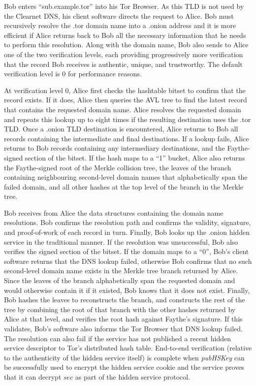 Bob enters ``sub.example.tor'' into his Tor Browser. As this TLD is not used by the Clearnet DNS, his client software directs the request to Alice. Bob must recursively resolve the .tor domain name into a .onion address and it is more efficient if Alice returns back to Bob all the necessary information that he needs to perform this resolution. Along with the domain name, Bob also sends to Alice one of the two verification levels, each providing progressively more verification that the record Bob receives is authentic, unique, and trustworthy. The default verification level is 0 for performance reasons.

At verification level 0, Alice first checks the hashtable bitset to confirm that the record exists. If it does, Alice then queries the AVL tree to find the latest record that contains the requested domain name. Alice resolves the requested domain and repeats this lookup up to eight times if the resulting destination uses the .tor TLD. Once a .onion TLD destination is encountered, Alice returns to Bob all records containing the intermediate and final destinations. If a lookup fails, Alice returns to Bob records containing any intermediary destinations, and the Faythe-signed section of the bitset. If the hash maps to a ``1'' bucket, Alice also returns the Faythe-signed root of the Merkle collision tree, the leaves of the branch containing neighbouring second-level domain names that alphabetically span the failed domain, and all other hashes at the top level of the branch in the Merkle tree.

Bob receives from Alice the data structures containing the domain name resolutions. Bob confirms the resolution path and confirms the validity, signature, and proof-of-work of each record in turn. Finally, Bob looks up the .onion hidden service in the traditional manner. If the resolution was unsuccessful, Bob also verifies the signed section of the bitset. If the domain maps to a ``0'', Bob's client software returns that the DNS lookup failed, otherwise Bob confirms that no such second-level domain name exists in the Merkle tree branch returned by Alice. Since the leaves of the branch alphabetically span the requested domain and would otherwise contain it if it existed, Bob knows that it does not exist. Finally, Bob hashes the leaves to reconstructs the branch, and constructs the rest of the tree by combining the root of that branch with the other hashes returned by Alice at that level, and verifies the root hash against Faythe's signature. If this validates, Bob's software also informs the Tor Browser that DNS lookup failed. The resolution can also fail if the service has not published a recent hidden service descriptor to Tor's distributed hash table. End-to-end verification (relative to the authenticity of the hidden service itself) is complete when \emph{pubHSKey} can be successfully used to encrypt the hidden service cookie and the service proves that it can decrypt $ sec $ as part of the hidden service protocol.

